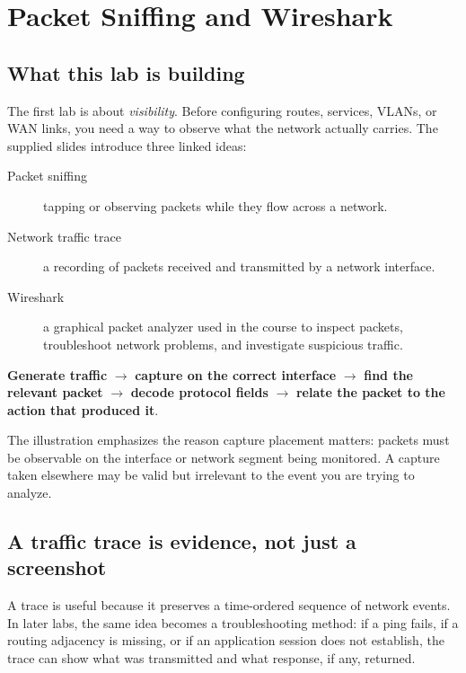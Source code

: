 \chapter{Packet Sniffing and Wireshark}

\section{What this lab is building}
The first lab is about \emph{visibility}. Before configuring routes, services, VLANs, or WAN links, you need a way to observe what the network actually carries. The supplied slides introduce three linked ideas:
\begin{description}
  \item[Packet sniffing] tapping or observing packets while they flow across a network.
  \item[Network traffic trace] a recording of packets received and transmitted by a network interface.
  \item[Wireshark] a graphical packet analyzer used in the course to inspect packets, troubleshoot network problems, and investigate suspicious traffic.
\end{description}

\begin{conceptmap}
\textbf{Generate traffic} $\rightarrow$ \textbf{capture on the correct interface} $\rightarrow$ \textbf{find the relevant packet} $\rightarrow$ \textbf{decode protocol fields} $\rightarrow$ \textbf{relate the packet to the action that produced it}.
\end{conceptmap}


The illustration emphasizes the reason capture placement matters: packets must be observable on the interface or network segment being monitored. A capture taken elsewhere may be valid but irrelevant to the event you are trying to analyze.

\section{A traffic trace is evidence, not just a screenshot}
A trace is useful because it preserves a time-ordered sequence of network events. In later labs, the same idea becomes a troubleshooting method: if a ping fails, if a routing adjacency is missing, or if an application session does not establish, the trace can show what was transmitted and what response, if any, returned.

